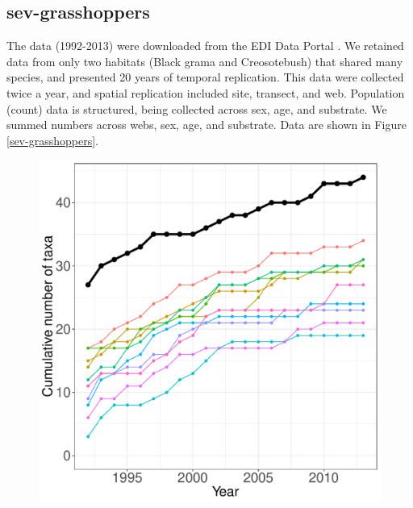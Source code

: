 \documentclass[11pt, oneside]{article}
\begin{document}
\subsection {sev-grasshoppers}
The data (1992-2013) were downloaded from the EDI Data Portal \citep{sev-grasshopper}.
We retained data from only two habitats (Black grama and Creosotebush) that shared many species, and presented 20 years of temporal replication. This data were collected twice a year, and spatial replication included site, transect, and web. 
Population (count) data is structured, being collected across sex, age, and substrate. 
We summed numbers across webs, sex, age, and substrate.
Data are shown in Figure \ref{sev-grasshoppers}.
  

\begin{figure}[h!]
\centering
\includegraphics[scale = 0.4]{sev-grasshopper-compagnoni_species_accumulation_curve.pdf}

\end{figure}
\end{document}
